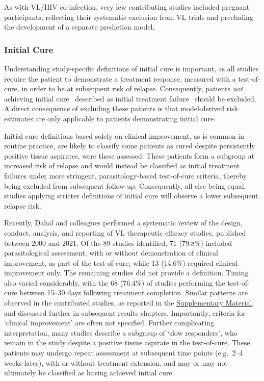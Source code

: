 As with VL/HIV co-infection, very few contributing studies included pregnant participants, reflecting their systematic exclusion from VL trials and precluding the development of a separate prediction model.

\subsubsection{Initial Cure\label{sec:meth_initial_cure}}

Understanding study-specific definitions of initial cure is important, as all studies require the patient to demonstrate a treatment response, measured with a test-of-cure, in order to be at subsequent risk of relapse. Consequently, patients \textit{not} achieving initial cure \textemdash\ described as initial treatment failure \textemdash\ should be excluded. A direct consequence of excluding these patients is that model-derived risk estimates are only applicable to patients demonstrating initial cure.

Initial cure definitions based solely on clinical improvement, as is common in routine practice, are likely to classify some patients as cured despite persistently positive tissue aspirates, were these assessed. These patients form a subgroup at increased risk of relapse and would instead be classified as initial treatment failures under more stringent, parasitology-based test-of-cure criteria, thereby being excluded from subsequent follow-up. Consequently, all else being equal, studies applying stricter definitions of initial cure will observe a lower subsequent relapse risk.

Recently, Dahal and colleagues performed a systematic review of the design, conduct, analysis, and reporting of VL therapeutic efficacy studies, published between 2000 and 2021. Of the 89 studies identified, 71 (79.8\%) included parasitological assessment, with or without demonstration of clinical improvement, as part of the test-of-cure, while 13 (14.6\%) required clinical improvement only. The remaining studies did not provide a definition. Timing also varied considerably, with the 68 (76.4\%) of studies performing the test-of-cure between 15--30 days following treatment completion\cite{dahal2024}. Similar patterns are observed in the contributed studies, as reported in the \href{https://github.com/jpwil/dphil}{Supplementary Material}, and discussed further in subsequent results chapters. Importantly, criteria for `clinical improvement' are often not specified. Further complicating interpretation, many studies describe a subgroup of `slow responders', who remain in the study despite a positive tissue aspirate in the test-of-cure. These patients may undergo repeat assessment at subsequent time points (e.g.\ 2--4 weeks later), with or without treatment extension, and may or may not ultimately be classified as having achieved initial cure.

